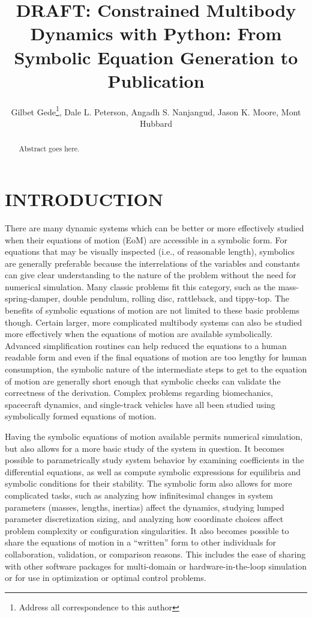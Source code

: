 \documentclass[twocolumn,10pt]{asme2e}
\title{DRAFT: Constrained Multibody Dynamics with Python: From Symbolic
Equation Generation to Publication}
\author{Gilbet Gede\thanks{Address all correspondence to this author}, Dale L.
Peterson, Angadh S. Nanjangud, Jason K. Moore, Mont Hubbard
  \affiliation{
    Sports Biomechanics Laboratory\\
    Department of Mechanical and Aerospace Engineering\\
    University of California\\
    Davis, California 95616\\
    Email: \{ggede, dlpeterson, asnanjangud, jkmoor, mhubbard\}@ucdavis.edu
  }
}
\begin{document}
\maketitle

\begin{abstract}
Abstract goes here.
\end{abstract}

\section*{INTRODUCTION}
There are many dynamic systems which can be better or more effectively studied
when their equations of motion (EoM) are accessible in a symbolic form. For
equations that may be visually inspected (i.e., of reasonable length),
symbolics are generally preferable because the interrelations of the variables
and constants can give clear understanding to the nature of the problem without
the need for numerical simulation. Many classic problems fit this category,
such as the mass-spring-damper, double pendulum, rolling disc, rattleback, and
tippy-top. The benefits of symbolic equations of motion are not limited to
these basic problems though. Certain larger, more complicated multibody systems
can also be studied more effectively when the equations of motion are available
symbolically. Advanced simplification routines can help reduced the equations
to a human readable form and even if the final equations of motion are too
lengthy for human consumption, the symbolic nature of the intermediate steps to
get to the equation of motion are generally short enough that symbolic checks
can validate the correctness of the derivation. Complex problems regarding
biomechanics, spacecraft dynamics, and single-track vehicles have all been
studied using symbolically formed equations of motion.

Having the symbolic equations of motion available permits numerical simulation,
but also allows for a more basic study of the system in question. It becomes
possible to parametrically study system behavior by examining coefficients in
the differential equations, as well as compute symbolic expressions for
equilibria and symbolic conditions for their stability. The symbolic form also
allows for more complicated tasks, such as analyzing how infinitesimal changes
in system parameters (masses, lengths, inertias) affect the dynamics, studying
lumped parameter discretization sizing, and analyzing how coordinate choices
affect problem complexity or configuration singularities. It also becomes
possible to share the equations of motion in a ``written'' form to other
individuals for collaboration, validation, or comparison reasons. This includes
the ease of sharing with other software packages for multi-domain or
hardware-in-the-loop simulation or for use in optimization or optimal control
problems.
\end{document}
